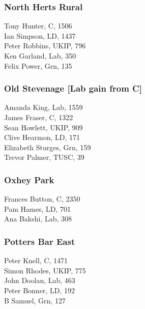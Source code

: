 \documentclass[a4paper,openany,10pt]{book}
\begin{document}
\subsubsection*{North Herts Rural}



Tony Hunter, C, 1506\\
Ian Simpson, LD, 1437\\
Peter Robbins, UKIP, 796\\
Ken Garland, Lab, 350\\
Felix Power, Grn, 135\\


\subsubsection*{Old Stevenage \hspace*{\fill}\nolinebreak[1]%
\enspace\hspace*{\fill}
[Lab gain from C]}



Amanda King, Lab, 1559\\
James Fraser, C, 1322\\
Sean Howlett, UKIP, 909\\
Clive Hearmon, LD, 171\\
Elizabeth Sturges, Grn, 159\\
Trevor Palmer, TUSC, 39\\


\subsubsection*{Oxhey Park}



Frances Button, C, 2350\\
Pam Hames, LD, 701\\
Ana Bakshi, Lab, 308\\


\subsubsection*{Potters Bar East}



Peter Knell, C, 1471\\
Simon Rhodes, UKIP, 775\\
John Doolan, Lab, 463\\
Peter Bonner, LD, 192\\
B Samuel, Grn, 127\\
\end{document}
